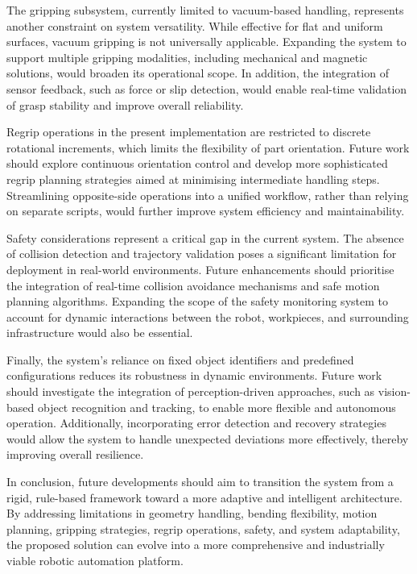 The gripping subsystem, currently limited to vacuum-based handling, represents another constraint on system versatility. While effective for flat and uniform surfaces, vacuum gripping is not universally applicable. Expanding the system to support multiple gripping modalities, including mechanical and magnetic solutions, would broaden its operational scope. In addition, the integration of sensor feedback, such as force or slip detection, would enable real-time validation of grasp stability and improve overall reliability.

Regrip operations in the present implementation are restricted to discrete rotational increments, which limits the flexibility of part orientation. Future work should explore continuous orientation control and develop more sophisticated regrip planning strategies aimed at minimising intermediate handling steps. Streamlining opposite-side operations into a unified workflow, rather than relying on separate scripts, would further improve system efficiency and maintainability.

Safety considerations represent a critical gap in the current system. The absence of collision detection and trajectory validation poses a significant limitation for deployment in real-world environments. Future enhancements should prioritise the integration of real-time collision avoidance mechanisms and safe motion planning algorithms. Expanding the scope of the safety monitoring system to account for dynamic interactions between the robot, workpieces, and surrounding infrastructure would also be essential.

Finally, the system's reliance on fixed object identifiers and predefined configurations reduces its robustness in dynamic environments. Future work should investigate the integration of perception-driven approaches, such as vision-based object recognition and tracking, to enable more flexible and autonomous operation. Additionally, incorporating error detection and recovery strategies would allow the system to handle unexpected deviations more effectively, thereby improving overall resilience.

In conclusion, future developments should aim to transition the system from a rigid, rule-based framework toward a more adaptive and intelligent architecture. By addressing limitations in geometry handling, bending flexibility, motion planning, gripping strategies, regrip operations, safety, and system adaptability, the proposed solution can evolve into a more comprehensive and industrially viable robotic automation platform.

